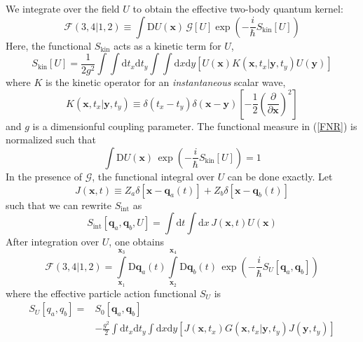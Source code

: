 We integrate over the field $U$ to obtain the effective two-body quantum kernel:
\begin{equation}
	\mathcal{F}(3,4|1,2) \equiv \int \mathrm{D}U(\mathbf{x}) \, \mathcal{G}[U] \exp{\left(- \frac{i}{\hbar} S_{\text{kin}}[U] \right)} \label{FNR}
\end{equation}
Here, the functional $S_{\text{kin}}$ acts as a kinetic term for $U$,
\begin{equation}
	S_{\text{kin}}[U] = \frac{1}{2g^{2}} \int \int \mathrm{d}t_{x} \mathrm{d}t_{y} \int \int \mathrm{d}x \mathrm{d}y \left[ U(\mathbf{x}) K(\mathbf{x}, t_{x}| \mathbf{y}, t_{y}) U(\mathbf{y}) \right] \label{SKinU}
\end{equation}
where $K$ is the kinetic operator for an \textit{instantaneous} scalar wave,
\begin{equation}
	K(\mathbf{x}, t_{x}| \mathbf{y}, t_{y}) \equiv \delta(t_{x} - t_{y}) \delta(\mathbf{x} - \mathbf{y}) \left[ - \frac{1}{2} \left(\frac{\partial}{\partial \mathbf{x}} \right)^{2} \right]
\end{equation}
and $g$ is a dimensionful coupling parameter. The functional measure in (\ref{FNR}) is normalized such that
\begin{equation}
	\int \mathrm{D}U(\mathbf{x}) \, \exp{\left(- \frac{i}{\hbar} S_{\text{kin}}[U] \right)} = 1
\end{equation}
In the presence of $\mathcal{G}$, the functional integral over $U$ can be done exactly. Let
\begin{equation}
	J(\mathbf{x}, t) \equiv Z_{a} \delta[\mathbf{x} - \mathbf{q}_{a}(t)] + Z_{b} \delta[\mathbf{x} - \mathbf{q}_{b}(t)]
\end{equation}
such that we can rewrite $S_{\text{int}}$ as
\begin{equation}
	S_{\text{int}}[ \mathbf{q}_{a}, \mathbf{q}_{b}, U] = \int \mathrm{d} t \int \mathrm{d}x \, J(\mathbf{x}, t) U(\mathbf{x})
\end{equation}
After integration over $U$, one obtains
\begin{equation}
	\mathcal{F}(3,4|1,2) = \int\limits_{\mathbf{x}_{1}}^{\mathbf{x}_{3}} \mathrm{D}\mathbf{q}_{a}(t) \int\limits_{\mathbf{x}_{2}}^{\mathbf{x}_{4}} \mathrm{D}\mathbf{q}_{b}(t) \, \exp{\left( - \frac{i}{\hbar} S_{U}[ \mathbf{q}_{a}, \mathbf{q}_{b}] \right)} \label{FCoul}
\end{equation}
where the effective particle action functional $S_{U}$ is
\begin{equation}
\begin{split}
	S_{U}[q_{a}, q_{b}] = {}& S_{0}[ \mathbf{q}_{a}, \mathbf{q}_{b}] \\
	&- \frac{g^{2}}{2} \int \mathrm{d}t_{x} \mathrm{d}t_{y} \int \mathrm{d}x \mathrm{d}y \left[ J(\mathbf{x}, t_{x}) G(\mathbf{x}, t_{x}| \mathbf{y}, t_{y}) J(\mathbf{y}, t_{y}) \right]
\end{split}
\end{equation}
